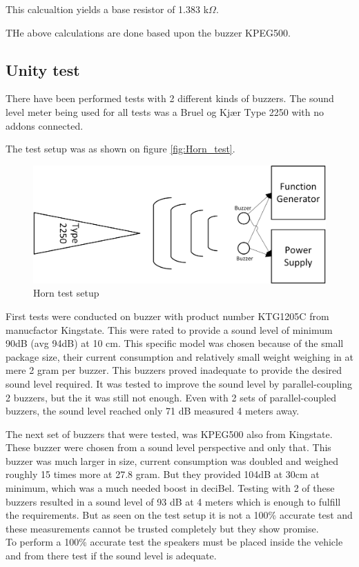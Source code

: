 This calcualtion yields a base resistor of 1.383 k$\Omega$.

THe above calculations are done based upon the buzzer KPEG500.

\subsection{Unity test}
There have been performed tests with 2 different kinds of buzzers. The sound level meter being used for all tests was a Bruel og Kjær Type 2250 \cite{BK2250} with no addons connected.

The test setup was as shown on figure \vref{fig:Horn_test}. 

\begin{figure}[H]
	\centering
	\includegraphics[width=0.7\linewidth]{Hardware/Pictures/Horn_test}
	\caption{Horn test setup}
	\label{fig:Horn_test}
\end{figure}

First tests were conducted on buzzer with product number KTG1205C\cite{KTG1205} from manucfactor Kingstate. This were rated to provide a sound level of minimum 90dB (avg 94dB) at 10 cm. This specific model was chosen because of the small package size, their current consumption and relatively small weight weighing in at mere 2 gram per buzzer. This buzzers proved inadequate to provide the desired sound level required. It was tested to improve the sound level by parallel-coupling 2 buzzers, but the it was still not enough. Even with 2 sets of parallel-coupled buzzers, the sound level reached only 71 dB measured 4 meters away.

The next set of buzzers that were tested, was KPEG500\cite{KPEG500} also from Kingstate. These buzzer were chosen from a sound level perspective and only that. This buzzer was much larger in size, current consumption was doubled and weighed roughly 15 times more at 27.8 gram. But they provided 104dB at 30cm at minimum, which was a much needed boost in deciBel. Testing with 2 of these buzzers resulted in a sound  level of 93 dB at 4 meters which is enough to fulfill the requirements. But as seen on the test setup it is not a 100\% accurate test and these measurements cannot be trusted completely but they show promise. \\
To perform a 100\% accurate test the speakers must be placed inside the vehicle and from there test if the sound level is adequate.

